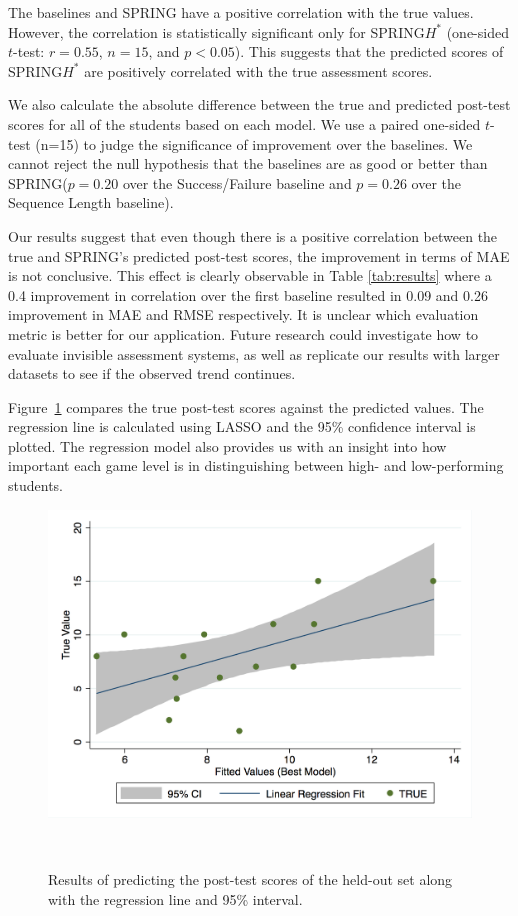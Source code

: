 \documentclass{sigchi}
\def\algname{SPRING\xspace}
\begin{document}
	
	The baselines and \algname have a positive correlation with the true values.
	However, the correlation is statistically significant only for \algname $H^*$ (one-sided $t$-test: $r=0.55$, $n=15$, and $p < 0.05$).
	This suggests that the predicted scores of \algname $H^*$ are positively correlated with the true assessment scores.
	
	We also calculate the absolute difference between the true and predicted post-test scores for all of the students based on each model.
	We use a paired one-sided $t$-test (n=15) to judge the significance of improvement over the baselines.
	We cannot reject the null hypothesis that the baselines are as good or better than  \algname ($p=0.20$ over the Success/Failure baseline and $p=0.26$ over the Sequence Length baseline).
	
	Our results suggest that even though there is a positive correlation between the true and \algname's predicted post-test scores, the improvement in terms of MAE is not conclusive. 
	This effect is clearly observable in Table \ref{tab:results} where a 0.4 improvement in correlation over the first baseline resulted in 0.09 and 0.26 improvement in MAE and RMSE respectively.
	It is unclear which evaluation metric is better for our application.
	Future research could investigate how to evaluate invisible assessment systems, as well as replicate our results with larger datasets to see if the observed trend continues.
	
	Figure~\ref{fig:regression} compares the true post-test scores against the predicted values.
	The regression line is calculated using LASSO and the 95\% confidence interval is plotted.
	The regression model also provides us with an insight into how important each game level is in distinguishing between high- and low-performing students.
	
		
		
	\begin{figure}
		\centering
		\includegraphics[width=0.9\columnwidth]{figures/regression.png}
		\caption{Results of predicting the post-test scores of the held-out set along with the regression line and 95\% interval.}~\label{fig:regression}
	\end{figure}
	
\end{document}

